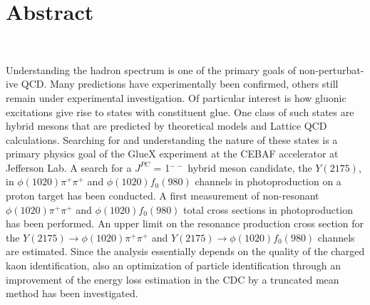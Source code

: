 \section*{Abstract} %

~\par Understanding the hadron spectrum is one of the primary goals of non-perturbat-ive QCD. Many predictions have experimentally been confirmed, others still remain under experimental investigation. Of particular interest is how gluonic excitations give rise to states with constituent glue. One class of such states are hybrid mesons that are predicted by theoretical models and Lattice QCD calculations. Searching for and understanding the nature of these states is a primary physics goal of the GlueX experiment at the CEBAF accelerator at Jefferson Lab. A search for a $J^{PC}$ = 1$^{--}$ hybrid meson candidate, the $Y(2175)$, in $\phi(1020)\pi^{+}\pi^{+}$ and $\phi(1020)f_{0}(980)$ channels in photoproduction on a proton target has been conducted. A first measurement of non-resonant $\phi(1020)\pi^{+}\pi^{+}$ and $\phi(1020)f_{0}(980)$ total cross sections in photoproduction has been performed. An upper limit on the resonance production cross section for the $Y(2175) \rightarrow \phi(1020)\pi^{+}\pi^{+}$ and $Y(2175) \rightarrow \phi(1020)f_0(980)$ channels are estimated. Since the analysis essentially depends on the quality of the charged kaon identification, also an optimization of particle identification through an improvement of the energy loss estimation in the CDC by a truncated mean method has been investigated.